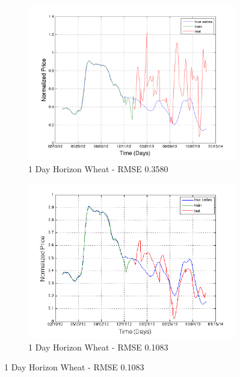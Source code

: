 \begin{figure}[H]
        \centering
        \begin{subfigure}[b]{0.5\textwidth}
                \includegraphics[width=\textwidth]{img/model/exp2/wheat/pred_1}
                \caption{1 Day Horizon Wheat - RMSE 0.3580}
                \label{fig:gull}
        \end{subfigure}%
           \begin{subfigure}[b]{0.5\textwidth}
                \includegraphics[width=\textwidth]{img/model/exp2_final/wheat_1}
                \caption{1 Day Horizon Wheat - RMSE 0.1083}
                \label{fig:gull}
        \end{subfigure}%
              \hfill    

\end{figure}
